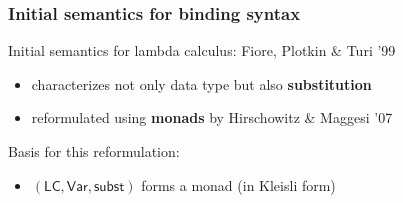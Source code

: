 \documentclass[
serif,
mathsans,
]
{beamer}
\newcommand{\constfont}[1]{\ensuremath{\mathsf{#1}}}
\newcommand{\subst}{\constfont{subst}}
\newcommand{\Var}{\constfont{Var}}
\newcommand{\LC}{\mathsf{LC}}
\newcommand{\fat}[1]{\textbf{#1}}
\begin{document}
\begin{frame}
 \frametitle{Initial semantics for binding syntax}
    
    \begin{block}{Initial semantics for lambda calculus: Fiore, Plotkin \& Turi '99}
      \begin{itemize}
       \item characterizes not only data type but also \fat{substitution} %
       \item reformulated using \fat{monads} by Hirschowitz \& Maggesi '07
      \end{itemize}
    \end{block}

  Basis for this reformulation:
    
    \begin{lemma}
       \begin{itemize}
         \item [] $(\LC, \Var, \subst)$ forms a monad (in Kleisli form)
       \end{itemize}

    \end{lemma}

    
%     

\end{frame}
\end{document}
